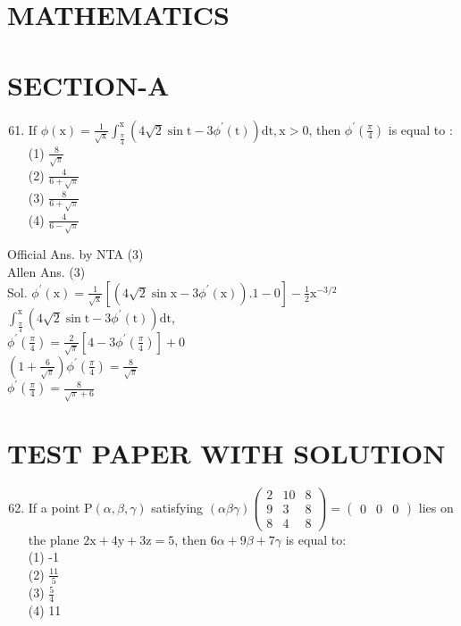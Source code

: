 \documentclass[10pt]{article}
\begin{document}
\section*{MATHEMATICS}
\section*{SECTION-A}
\begin{enumerate}
  \setcounter{enumi}{60}
  \item If \(\phi(\mathrm{x})=\frac{1}{\sqrt{\mathrm{x}}} \int_{\frac{\pi}{4}}^{\mathrm{x}}\left(4 \sqrt{2} \sin \mathrm{t}-3 \phi^{\prime}(\mathrm{t})\right) \mathrm{dt}, \mathrm{x}>0\), then \(\phi^{\prime}\left(\frac{\pi}{4}\right)\) is equal to :\\
(1) \(\frac{8}{\sqrt{\pi}}\)\\
(2) \(\frac{4}{6+\sqrt{\pi}}\)\\
(3) \(\frac{8}{6+\sqrt{\pi}}\)\\
(4) \(\frac{4}{6-\sqrt{\pi}}\)
\end{enumerate}

Official Ans. by NTA (3)\\
Allen Ans. (3)\\
Sol. \(\phi^{\prime}(\mathrm{x})=\frac{1}{\sqrt{\mathrm{x}}}\left[\left(4 \sqrt{2} \sin \mathrm{x}-3 \phi^{\prime}(\mathrm{x})\right) .1-0\right]-\frac{1}{2} \mathrm{x}^{-3 / 2}\)\\
\(\int_{\frac{\pi}{4}}^{\mathrm{x}}\left(4 \sqrt{2} \sin \mathrm{t}-3 \phi^{\prime}(\mathrm{t})\right) \mathrm{dt}\),\\
\(\phi^{\prime}\left(\frac{\pi}{4}\right)=\frac{2}{\sqrt{\pi}}\left[4-3 \phi^{\prime}\left(\frac{\pi}{4}\right)\right]+0\)\\
\(\left(1+\frac{6}{\sqrt{\pi}}\right) \phi^{\prime}\left(\frac{\pi}{4}\right)=\frac{8}{\sqrt{\pi}}\)\\
\(\phi^{\prime}\left(\frac{\pi}{4}\right)=\frac{8}{\sqrt{\pi}+6}\)

\section*{TEST PAPER WITH SOLUTION}
\begin{enumerate}
  \setcounter{enumi}{61}
  \item If a point \(\mathrm{P}(\alpha, \beta, \gamma)\) satisfying \((\alpha \beta \gamma)\left(\begin{array}{ccc}2 & 10 & 8 \\ 9 & 3 & 8 \\ 8 & 4 & 8\end{array}\right)=\left(\begin{array}{lll}0 & 0 & 0\end{array}\right)\) lies on the plane \(2 \mathrm{x}+4 \mathrm{y}+3 \mathrm{z}=5\), then \(6 \alpha+9 \beta+7 \gamma\) is equal to:\\
(1) -1\\
(2) \(\frac{11}{5}\)\\
(3) \(\frac{5}{4}\)\\
(4) 11
\end{enumerate}
\end{document}
